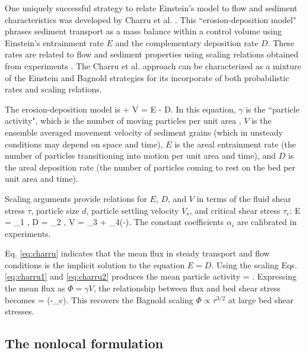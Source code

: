 One uniquely successful strategy to relate Einstein's model to flow and sediment characteristics was developed by Charru et al. \citep{Charru2004,Charru2006}. This ``erosion-deposition model" phrases sediment transport as a mass balance within a control volume using Einstein's entrainment rate $E$ and the complementary deposition rate $D$. These rates are related to flow and sediment properties using scaling relations obtained from experiments \citep{Charru2004, Charru2006, Lajeunesse2010,Seizilles2014,Lajeunesse2015}. The Charru et al. approach can be characterized as a mixture of the Einstein and Bagnold strategies for its incorporate of both probabilistic rates and scaling relations.

The erosion-deposition model is
\be \pt \gamma +  \px V \gamma = E - D. \label{eq:charru}\ee
In this equation, $\gamma$ is the ``particle activity", which is the number of moving particles per unit area \citep{Furbish2012}, $V$ is the ensemble averaged movement velocity of sediment grains (which in unsteady conditions may depend on space and time), $E$ is the areal entrainment rate (the number of particles transitioning into motion per unit area and time), and $D$ is the areal deposition rate (the number of particles coming to rest on the bed per unit area and time).

Scaling arguments provide relations for $E$, $D$, and $V$ in terms of the fluid shear stress $\tau$, particle size $d$, particle settling velocity $V_s$, and critical shear stress $\tau_c$:
\be E = \alpha_1 , \label{eq:charru1}\ee
\be D  = \alpha_2 , \ee
\be V = \alpha_3 + \alpha_4(\sqrt{\tau}-). \label{eq:charru2}\ee
The constant coefficients $\alpha_i$ are calibrated in experiments.

Eq. \ref{eq:charru} indicates that the mean flux in steady transport and flow conditions is the implicit solution to the equation $E = D.$
Using the scaling Eqs. \ref{eq:charru1} and \ref{eq:charru2} produces the mean particle activity
\be \gamma = .\ee
Expressing the mean flux as $\Phi = \gamma V$, the relationship between flux and bed shear stress becomes
\be \Phi = \big(\tau-\tau_c\big). \ee
This recovers the Bagnold scaling $\Phi \propto \tau^{3/2}$ at large bed shear stresses.

\subsection{The nonlocal formulation}
\label{sec:nonlocal}

